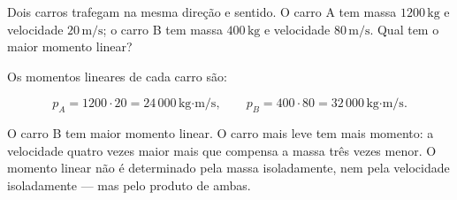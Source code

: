 \vspace{0.3cm}


\begin{exemplo}[Nível I]\label{exemplo_newton_momentumex01}

Dois carros trafegam na mesma direção e sentido. O carro A tem massa
$1200\,\text{kg}$ e velocidade $20\,\text{m/s}$; o carro B tem massa
$400\,\text{kg}$ e velocidade $80\,\text{m/s}$. Qual tem o maior momento linear?

\resolucao

Os momentos lineares de cada carro são:

$$p_A = 1200\cdot 20 = 24\,000\,\text{kg·m/s}, \qquad
  p_B = 400\cdot 80 = 32\,000\,\text{kg·m/s}.$$

O carro B tem maior momento linear. O carro mais leve tem mais momento: a
velocidade quatro vezes maior mais que compensa a massa três vezes menor.
O momento linear não é determinado pela massa isoladamente, nem pela
velocidade isoladamente --- mas pelo produto de ambas.

\end{exemplo}


\vspace{0.3cm}




